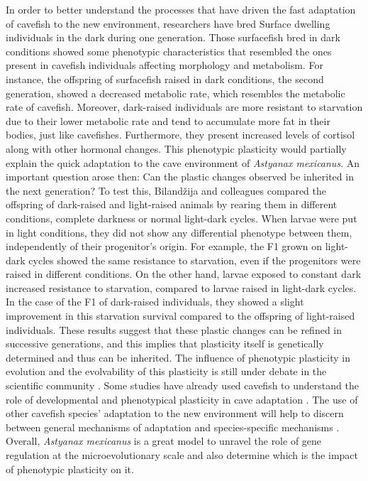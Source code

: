 In order to better understand the processes that have driven the fast adaptation of cavefish to the new environment, researchers have bred Surface dwelling individuals in the dark \parencite{bilandzija_phenotypic_2020} during one generation. Those surfacefish bred in dark conditions showed some phenotypic characteristics that resembled the ones present in cavefish individuals affecting morphology and metabolism. For instance, the offspring of surfacefish raised in dark conditions, the second generation, showed a decreased metabolic rate, which resembles the metabolic rate of cavefish. Moreover, dark-raised individuals are more resistant to starvation due to their lower metabolic rate and tend to accumulate more fat in their bodies, just like cavefishes. Furthermore, they present increased levels of cortisol along with other hormonal changes. This phenotypic plasticity would partially explain the quick adaptation to the cave environment of \textit{Astyanax mexicanus}. An important question arose then: Can the plastic changes observed be inherited in the next generation? To test this, Bilandžija and colleagues compared the offspring of dark-raised and light-raised animals by rearing them in different conditions, complete darkness or normal light-dark cycles. When larvae were put in light conditions, they did not show any differential phenotype between them, independently of their progenitor's origin. For example, the F1 grown on light-dark cycles showed the same resistance to starvation, even if the progenitors were raised in different conditions. On the other hand, larvae exposed to constant dark increased resistance to starvation, compared to larvae raised in light-dark cycles. In the case of the F1 of dark-raised individuals, they showed a slight improvement in this starvation survival compared to the offspring of light-raised individuals. These results suggest that these plastic changes can be refined in successive generations, and this implies that plasticity itself is genetically determined and thus can be inherited. The influence of phenotypic plasticity in evolution and the evolvability of this plasticity is still under debate in the scientific community \parencite{fox_beyond_2019, kristensen_adaptation_2020, mallard_evolution_2020}. Some studies have already used cavefish to understand the role of developmental and phenotypical plasticity in cave adaptation \parencite{bilandzija_phenotypic_2020, blin_developmental_2018}. The use of other cavefish species' adaptation to the new environment will help to discern between general mechanisms of adaptation and species-specific mechanisms \parencite{behrmann-godel_phenotypic_2023}. Overall, \textit{Astyanax mexicanus} is a great model to unravel the role of gene regulation at the microevolutionary scale and also determine which is the impact of phenotypic plasticity on it.













